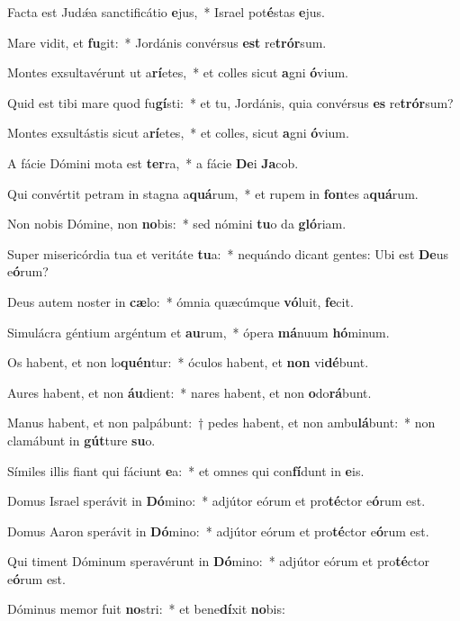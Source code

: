 \item Facta est Judǽa sanctificátio \textbf{e}jus,~* Israel pot\textbf{é}stas \textbf{e}jus.
\item Mare vidit, et \textbf{fu}git:~* Jordánis convérsus \textbf{est} re\textbf{trór}sum.
\item Montes exsultavérunt ut a\textbf{rí}etes,~* et colles sicut \textbf{a}gni \textbf{ó}vium.
\item Quid est tibi mare quod fu\textbf{gí}sti:~* et tu, Jordánis, quia convérsus \textbf{es} re\textbf{trór}sum?
\item Montes exsultástis sicut a\textbf{rí}etes,~* et colles, sicut \textbf{a}gni \textbf{ó}vium.
\item A fácie Dómini mota est \textbf{ter}ra,~* a fácie \textbf{De}i \textbf{Ja}cob.
\item Qui convértit petram in stagna a\textbf{quá}rum,~* et rupem in \textbf{fon}tes a\textbf{quá}rum.
\item Non nobis Dómine, non \textbf{no}bis:~* sed nómini \textbf{tu}o da \textbf{gló}riam.
\item Super misericórdia tua et veritáte \textbf{tu}a:~* nequándo dicant gentes: Ubi est \textbf{De}us e\textbf{ó}rum?
\item Deus autem noster in \textbf{cæ}lo:~* ómnia quæcúmque \textbf{vó}luit, \textbf{fe}cit.
\item Simulácra géntium argéntum et \textbf{au}rum,~* ópera \textbf{má}nuum \textbf{hó}minum.
\item Os habent, et non lo\textbf{quén}tur:~* óculos habent, et \textbf{non} vi\textbf{dé}bunt.
\item Aures habent, et non \textbf{áu}dient:~* nares habent, et non \textbf{o}do\textbf{rá}bunt.
\item Manus habent, et non palpábunt:~† pedes habent, et non ambu\textbf{lá}bunt:~* non clamábunt in \textbf{gút}ture \textbf{su}o.
\item Símiles illis fiant qui fáciunt \textbf{e}a:~* et o\-mnes qui con\textbf{fí}dunt in \textbf{e}is.
\item Domus Israel sperávit in \textbf{Dó}mino:~* adjútor eórum et pro\textbf{té}ctor e\textbf{ó}rum est.
\item Domus Aaron sperávit in \textbf{Dó}mino:~* adjútor eórum et pro\textbf{té}ctor e\textbf{ó}rum est.
\item Qui timent Dóminum speravérunt in \textbf{Dó}mino:~* adjútor eórum et pro\textbf{té}ctor e\textbf{ó}rum est.
\item Dóminus memor fuit \textbf{no}stri:~* et bene\textbf{dí}xit \textbf{no}bis:

